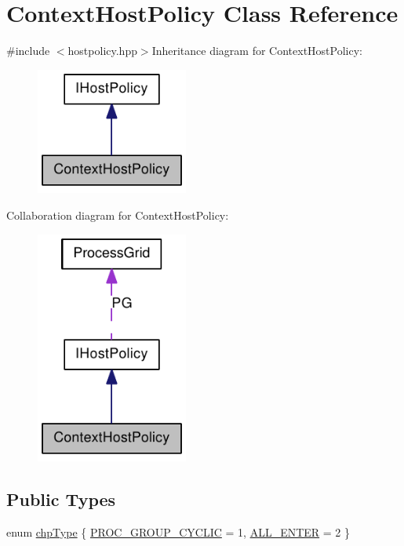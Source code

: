 \hypertarget{class_context_host_policy}{
\section{ContextHostPolicy Class Reference}
\label{class_context_host_policy}
}


{\ttfamily \#include $<$hostpolicy.hpp$>$}Inheritance diagram for ContextHostPolicy:\nopagebreak
\begin{figure}[H]
\begin{center}
\leavevmode
\includegraphics[width=142pt]{class_context_host_policy__inherit__graph}
\end{center}
\end{figure}
Collaboration diagram for ContextHostPolicy:\nopagebreak
\begin{figure}[H]
\begin{center}
\leavevmode
\includegraphics[width=142pt]{class_context_host_policy__coll__graph}
\end{center}
\end{figure}
\subsection*{Public Types}
\begin{DoxyCompactItemize}
\item 
enum \hyperlink{class_context_host_policy_a8050b2efb974f28cbabe561cb04989a1}{chpType} \{ \hyperlink{class_context_host_policy_a8050b2efb974f28cbabe561cb04989a1a39048ccb3419ff4d10c0fb37662b0ce3}{PROC\_\-GROUP\_\-CYCLIC} = 1, 
\hyperlink{class_context_host_policy_a8050b2efb974f28cbabe561cb04989a1ad393362f6d0433881a2fa716cbda27e4}{ALL\_\-ENTER} = 2
 \}
\end{DoxyCompactItemize}

